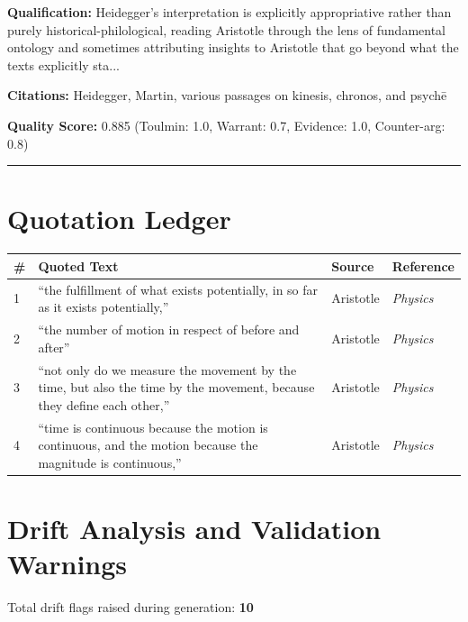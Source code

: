 \documentclass[12pt,a4paper]{article}
\begin{document}
\textbf{Qualification:} Heidegger's interpretation is explicitly appropriative rather than purely historical-philological, reading Aristotle through the lens of fundamental ontology and sometimes attributing insights to Aristotle that go beyond what the texts explicitly sta...

\textbf{Citations:} Heidegger, Martin, various passages on kinesis, chronos, and psychē

\textbf{Quality Score:} 0.885 (Toulmin: 1.0, Warrant: 0.7, Evidence: 1.0, Counter-arg: 0.8)

\medskip\hrule\medskip


\section{Quotation Ledger}

\begin{longtable}{p{0.5cm}p{8cm}p{2.5cm}p{2.5cm}}
\toprule
\textbf{\#} & \textbf{Quoted Text} & \textbf{Source} & \textbf{Reference} \\
\midrule
1 & ``the fulfillment of what exists potentially, in so far as it exists potentially,'' & Aristotle & \textit{Physics} \\
\midrule
2 & ``the number of motion in respect of before and after'' & Aristotle & \textit{Physics} \\
\midrule
3 & ``not only do we measure the movement by the time, but also the time by the movement, because they define each other,'' & Aristotle & \textit{Physics} \\
\midrule
4 & ``time is continuous because the motion is continuous, and the motion because the magnitude is continuous,'' & Aristotle & \textit{Physics} \\
\midrule
\bottomrule
\end{longtable}


\section{Drift Analysis and Validation Warnings}

Total drift flags raised during generation: \textbf{10}
\end{document}
